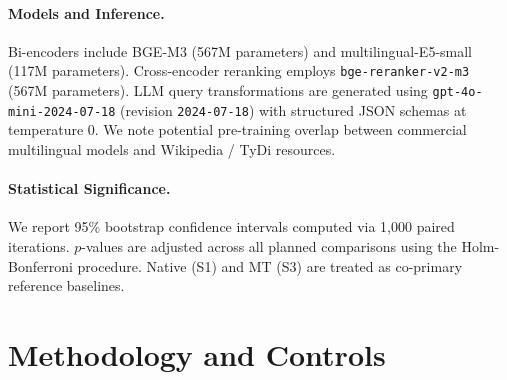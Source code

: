 \documentclass[11pt]{article}
\begin{document}
\begin{table}[t]
\centering
\small
{}
\caption{Summary leaderboard of top-performing configurations across evaluated research questions.}
\label{tab:summary_leaderboard}
\end{table}

\paragraph{Models and Inference.} Bi-encoders include BGE-M3 (567M parameters) and multilingual-E5-small (117M parameters). Cross-encoder reranking employs \texttt{bge-reranker-v2-m3} (567M parameters). LLM query transformations are generated using \texttt{gpt-4o-mini-2024-07-18} (revision \texttt{2024-07-18}) with structured JSON schemas at temperature 0. We note potential pre-training overlap between commercial multilingual models and Wikipedia / TyDi resources.

\paragraph{Statistical Significance.} We report 95\% bootstrap confidence intervals computed via 1,000 paired iterations. $p$-values are adjusted across all planned comparisons using the Holm-Bonferroni procedure. Native (S1) and MT (S3) are treated as co-primary reference baselines.

\section{Methodology and Controls}
\label{sec:methods}
\end{document}
